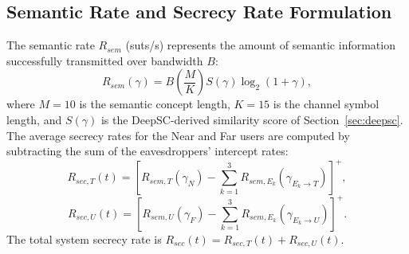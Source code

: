 \documentclass[journal,onecolumn]{IEEEtran}
\begin{document}
\subsection{Semantic Rate and Secrecy Rate Formulation}
The semantic rate $R_{sem}$ (suts/s) represents the amount of semantic information successfully transmitted over bandwidth $B$:
\begin{equation}
    R_{sem}(\gamma) = B \left(\frac{M}{K}\right) S(\gamma) \log_2(1 + \gamma),
\end{equation}
where $M = 10$ is the semantic concept length, $K = 15$ is the channel symbol length, and $S(\gamma)$ is the DeepSC-derived similarity score of Section~\ref{sec:deepsc}.
The average secrecy rates for the Near and Far users are computed by subtracting the sum of the eavesdroppers' intercept rates:
\begin{equation}
    R_{sec, T}(t) = \left[ R_{sem, T}(\gamma_N) - \sum_{k=1}^3 R_{sem, E_k}(\gamma_{E_k \to T}) \right]^+,
\end{equation}
\begin{equation}
    R_{sec, U}(t) = \left[ R_{sem, U}(\gamma_F) - \sum_{k=1}^3 R_{sem, E_k}(\gamma_{E_k \to U}) \right]^+.
\end{equation}
The total system secrecy rate is $R_{sec}(t) = R_{sec, T}(t) + R_{sec, U}(t)$.
\end{document}
